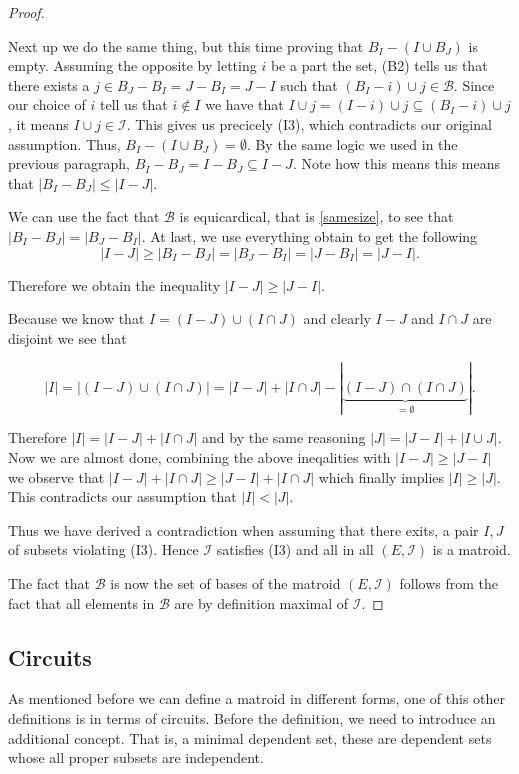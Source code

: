 \begin{proof}
\begin{enumerate}
        Next up we do the same thing, but this time proving that $B_I-(I\cup B_J)$ is empty. Assuming the opposite by letting $i$ be a part the set, (B2) tells us that there exists a $j\in B_J-B_I=J-B_I=J-I$ such that $(B_I-i)\cup j\in\mathcal{B}$. Since our choice of $i$ tell us that $i \notin I$ we have that $I\cup j = (I-i)\cup j \subseteq (B_I-i)\cup j$, it means $I\cup j\in\mathcal{I}$. This gives us precicely (I3), which contradicts our original assumption. Thus, $B_I-(I\cup B_J)=\emptyset$. By the same logic we used in the previous paragraph, $B_I-B_J=I-B_J\subseteq I-J$. Note how this means this means that $|B_I-B_J|\leq|I-J|$.

        We can use the fact that $\mathcal{B}$ is equicardical, that is \ref{samesize}, to see that $|B_I-B_J|=|B_J-B_I|$. At last, we use everything obtain to get the following
        $$ |I-J|\geq |B_I-B_J|=|B_J-B_I|=|J-B_I|=|J-I|. $$

        Therefore we obtain the inequality $|I - J|\geq |J - I|.$

        Because we know that $ I = (I - J) \cup (I\cap J)$ and clearly $I - J$ and $I \cap J$ are disjoint we see that

        $$ |I| = |(I - J)\cup (I \cap J)| = |I - J| + |I \cap J| - |\underbrace{(I - J) \cap (I \cap J)}_{ = \emptyset}|.$$

        Therefore $|I| = |I-J| + |I \cap J|$ and by the same reasoning $|J| = |J - I| + |I\cup J|$. Now we are almost done, combining the above ineqalities with $|I - J|\geq |J - I|$ we observe that $|I-J| +|I \cap J|\geq |J - I| + |I \cap J|$ which finally implies $|I|\geq |J|$. This contradicts our assumption that $|I|< |J|$. 
        
        Thus we have derived a contradiction when assuming that there exits, a pair $I, J$ of subsets violating (I3). Hence $\mathcal{I}$ satisfies (I3) and all in all $(E,\mathcal{I})$ is a matroid.

        
    \end{enumerate}  

    
    The fact that $\mathcal{B}$ is now the set of bases of the matroid $(E,\mathcal{I})$ follows from the fact that all elements in $\mathcal{B}$ are by definition maximal of $\mathcal{I}$.
\end{proof}



\newpage

\subsection{Circuits} 
As mentioned before we can define a matroid in different forms, one of this other definitions is in terms of circuits. Before the definition, we need to introduce an additional concept. 
That is, a minimal dependent set, these are dependent sets whose all proper subsets are independent.

